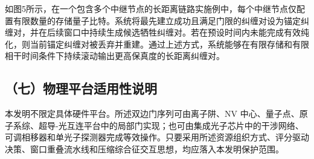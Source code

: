 \documentclass[12pt,a4paper]{article}
\begin{document}
如图5所示，在一个包含多个中继节点的长距离链路实施例中，每个中继节点仅配置有限数量的存储量子比特。系统将最先建立成功且满足门限的纠缠对设为锚定纠缠对，并在后续窗口中持续生成候选牺牲纠缠对。若在预设时间内未能完成有效纯化，则当前锚定纠缠对被丢弃并重建。通过上述方式，系统能够在有限存储和有限相干时间条件下持续滚动输出更高保真度的长距离纠缠对。

\subsection*{（七）物理平台适用性说明}

本发明不限定具体硬件平台。所述双边门序列可由离子阱、NV 中心、量子点、原子系综、超导-光互连平台中的局部门实现；也可由集成光子芯片中的干涉网络、可调相移器和单光子探测器完成等效操作。只要采用所述资源组织方式、评分驱动决策、窗口重叠流水线和压缩综合征交互思想，均应落入本发明保护范围。
\end{document}
